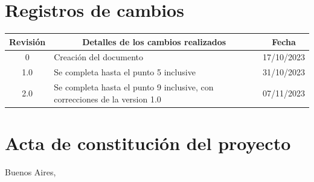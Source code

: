 \documentclass[
11pt, %
]{charter}
\begin{document}
\maketitle
\thispagestyle{empty}
\pagebreak


\thispagestyle{empty}
{\setlength{\parskip}{0pt}
\tableofcontents{}
}
\pagebreak


\section*{Registros de cambios}
\label{sec:registro}


\begin{table}[ht]
\label{tab:registro}
\centering
\begin{tabularx}{\linewidth}{@{}|c|X|c|@{}}
\hline
\rowcolor[HTML]{C0C0C0} 
Revisión & \multicolumn{1}{c|}{\cellcolor[HTML]{C0C0C0}Detalles de los cambios realizados} & Fecha      \\ \hline
 0      & Creación del documento                                 & 17/10/2023 \\ \hline
1.0      & Se completa hasta el punto 5 inclusive                & 31/10/2023 \\ \hline
2.0      & Se completa hasta el punto 9 inclusive, con correcciones de la version 1.0               & 07/11/2023 \\ \hline
\end{tabularx}
\end{table}

\pagebreak



\section*{Acta de constitución del proyecto}
\label{sec:acta}

\begin{flushright}
Buenos Aires, \fechaInicioName
\end{flushright}
\end{document}

